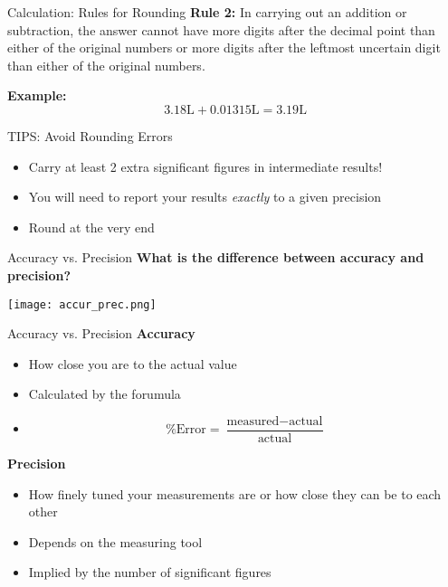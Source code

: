 \documentclass[11pt]{beamer}
\begin{document}
\begin{frame}{Calculation: Rules for Rounding}
  \textbf{Rule 2:} In carrying out an addition or subtraction, the
  answer cannot have more digits after the decimal point than either
  of the original numbers or more digits after the leftmost uncertain
  digit than either of the original numbers.

  \textbf{Example:}
  \begin{equation}
    3.18 \text{L} + 0.01315 \text{L} = 3.19 \text{L}
  \end{equation}
\end{frame}

\begin{frame}{TIPS: Avoid Rounding Errors}
  \begin{itemize}
  \item Carry at least 2 extra significant figures in
    intermediate results!
  \item You will need to report your results \emph{exactly} to a
    given precision
  \item Round at the very end
  \end{itemize}

\end{frame}

\begin{frame}{Accuracy vs. Precision}
  \textbf{What is the difference between accuracy
    and precision?}

  \centering
  \texttt{[image: accur\_prec.png]}
\end{frame}

\begin{frame}{Accuracy vs. Precision}
  \textbf{Accuracy}
  \begin{itemize}
  \item How close you are to the actual value
  \item Calculated by the forumula
  \item[] \begin{equation}
    \% \text{Error} = \frac{\text{measured} - \text{actual}}{\text{actual}}
  \end{equation}
  \end{itemize}
  
  \textbf{Precision}
  \begin{itemize}
  \item How finely tuned your measurements are or
    how close they can be to each other
  \item Depends on the measuring tool
  \item Implied by the number of significant figures
  \end{itemize}
\end{frame}
\end{document}
